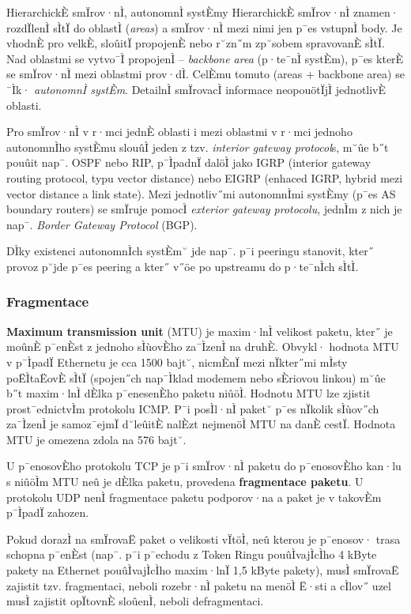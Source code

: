 \begin{obecne}{HierarchickÈ smÏrov·nÌ, autonomnÌ systÈmy}
HierarchickÈ smÏrov·nÌ znamen· rozdÏlenÌ sÌtÏ do oblastÌ (\emph{areas}) a smÏrov·nÌ mezi nimi jen p¯es vstupnÌ body. Je vhodnÈ pro velkÈ, sloûitÏ propojenÈ nebo r˘zn˝m zp˘sobem spravovanÈ sÌtÏ. Nad oblastmi se vytvo¯Ì propojenÌ -- \emph{backbone area} (p·te¯nÌ systÈm), p¯es kterÈ se smÏrov·nÌ mezi oblastmi prov·dÌ. CelÈmu tomuto (areas + backbone area) se ¯Ìk· \emph{autonomnÌ systÈm}. DetailnÌ smÏrovacÌ informace neopouötÏjÌ jednotlivÈ oblasti. 

Pro smÏrov·nÌ v r·mci jednÈ oblasti i mezi oblastmi v r·mci jednoho autonomnÌho systÈmu slouûÌ jeden z tzv. \emph{interior gateway protocol}s, m˘ûe b˝t pouûit nap¯. OSPF nebo RIP, p¯ÌpadnÏ dalöÌ jako IGRP (interior gateway routing protocol, typu vector distance) nebo EIGRP (enhaced IGRP, hybrid mezi vector distance a link state). Mezi jednotliv˝mi autonomnÌmi systÈmy (p¯es AS boundary routers) se smÏruje pomocÌ \emph{exterior gateway protocolu}, jednÌm z nich je nap¯. \emph{Border Gateway Protocol} (BGP).

DÌky existenci autonomnÌch systÈm˘ jde nap¯. p¯i peeringu stanovit, kter˝ provoz p˘jde p¯es peering a kter˝ v˝öe po upstreamu do p·te¯nÌch sÌtÌ.
\end{obecne}


\subsubsection*{Fragmentace}

\textbf{Maximum transmission unit} (MTU) je maxim·lnÌ velikost paketu, kter˝ je moûnÈ p¯enÈst z jednoho sÌùovÈho za¯ÌzenÌ na druhÈ. Obvykl· hodnota MTU v p¯ÌpadÏ Ethernetu je cca 1500 bajt˘, nicmÈnÏ mezi nÏkter˝mi mÌsty poËÌtaËovÈ sÌtÏ (spojen˝ch nap¯Ìklad modemem nebo sÈriovou linkou) m˘ûe b˝t maxim·lnÌ dÈlka p¯enesenÈho paketu niûöÌ. Hodnotu MTU lze zjistit prost¯ednictvÌm protokolu ICMP. P¯i posÌl·nÌ paket˘ p¯es nÏkolik sÌùov˝ch za¯ÌzenÌ je samoz¯ejmÏ d˘leûitÈ nalÈzt nejmenöÌ MTU na danÈ cestÏ. Hodnota MTU je omezena zdola na 576 bajt˘.

U p¯enosovÈho protokolu TCP je p¯i smÏrov·nÌ paketu do p¯enosovÈho kan·lu s niûöÌm MTU neû je dÈlka paketu, provedena \textbf{fragmentace paketu}. U protokolu UDP nenÌ fragmentace paketu podporov·na a paket je v takovÈm p¯ÌpadÏ zahozen.

 Pokud dorazÌ na smÏrovaË paket o velikosti vÏtöÌ, neû kterou je p¯enosov· trasa schopna p¯enÈst (nap¯. p¯i p¯echodu z Token Ringu pouûÌvajÌcÌho 4 kByte pakety na Ethernet pouûÌvajÌcÌho maxim·lnÏ 1,5 kByte pakety), musÌ smÏrovaË zajistit tzv. fragmentaci, neboli rozebr·nÌ paketu na menöÌ Ë·sti a cÌlov˝ uzel musÌ zajistit opÏtovnÈ sloûenÌ, neboli defragmentaci.

